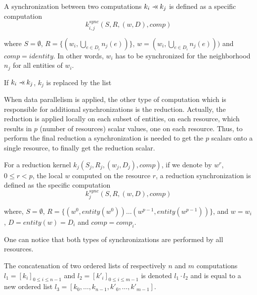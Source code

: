 \begin{mydef}
A synchronization between two computations $k_i \pprec k_j$ is defined as a specific computation 
\begin{equation*}
k_{i,j}^{sync}(S,R,(w,D),comp)
\end{equation*}
\end{mydef}
where $S=\emptyset$, $R=\{(w_i,\bigcup_{e \in D_i} n_j(e))\}$, $w=(w_i,\bigcup_{e \in D_i} n_j(e)))$ and $comp=identity$. In other words, $w_i$ has to be synchronized for the neighborhood $n_j$ for all entities of $w_i$.

\begin{mydef}
If $k_i \pprec k_j$, $k_j$ is replaced by the list
\begin{equation*}
[k_{i,j}^{sync}, k_j]
\end{equation*}
\end{mydef}

When data parallelism is applied, the other type of computation which is responsible for additional synchronizations is the reduction. Actually, the reduction is applied locally on each subset of entities, on each resource, which results in $p$ (number of resources) scalar values, one on each resource. Thus, to perform the final reduction a synchronization is needed to get the $p$ scalars onto a single resource, to finally get the reduction scalar.

\begin{mydef}
For a reduction kernel $k_j(S_j,R_j,(w_j,D_j),comp)$, if we denote by $w^r$, $0 \leq r<p$, the local $w$ computed on the resource $r$, a reduction synchronization is defined as the specific computation 
\begin{equation*}
k_{j}^{sync}(S,R,(w,D),comp)
\end{equation*}
\end{mydef}
where, $S=\emptyset$, $R=\{(w^0,entity(w^0)) \dots (w^{p-1},entity(w^{p-1}))\}$, and $w=w_i$, $D=entity(w)=D_i$ and $comp=comp_i$.

One can notice that both types of synchronizations are performed by all resources.

\begin{mydef}
The concatenation of two ordered lists of respectively $n$ and $m$ computations $l_1=[k_i]_{0 \leq i \leq n-1}$ and $l_2=[k'_i]_{0 \leq i \leq m-1}$ is denoted $l_1 \cdot l_2$ and is equal to a new ordered list $l_3=[k_0,\dots,k_{n-1},k'_0,\dots,k'_{m-1}]$.
\end{mydef}

